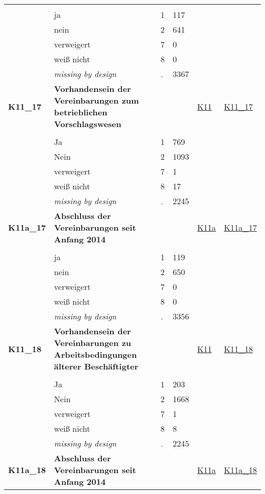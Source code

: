 \begin{longtable}{| L{2.45cm} | L{6cm} | C{1.5cm} | R{1cm} | C{2.25cm} | C{2.25cm} |}
   &  &  &  &  &  \\ 
   & ja & 1 & 117 &  &  \\ 
   & nein & 2 & 641 &  &  \\ 
   & verweigert & 7 & 0 &  &  \\ 
   & weiß nicht & 8 & 0 &  &  \\ 
   & \textit{missing by design} & \textit{.} & 3367 &  &  \\ 
   \midrule
\textbf{K11\_17}\label{var:K11:17} & \textbf{Vorhandensein der Vereinbarungen zum betrieblichen Vorschlagswesen} &  &  & \hyperref[K11]{K11} & \hyperref[var:suf:K11:17]{K11\_17} \\ 
   &  &  &  &  &  \\ 
   & Ja & 1 & 769 &  &  \\ 
   & Nein & 2 & 1093 &  &  \\ 
   & verweigert & 7 & 1 &  &  \\ 
   & weiß nicht & 8 & 17 &  &  \\ 
   & \textit{missing by design} & \textit{.} & 2245 &  &  \\ 
   \midrule
\textbf{K11a\_17}\label{var:K11a:17} & \textbf{Abschluss der Vereinbarungen seit Anfang 2014} &  &  & \hyperref[K11a]{K11a} & \hyperref[var:suf:K11a:17]{K11a\_17} \\ 
   &  &  &  &  &  \\ 
   & ja & 1 & 119 &  &  \\ 
   & nein & 2 & 650 &  &  \\ 
   & verweigert & 7 & 0 &  &  \\ 
   & weiß nicht & 8 & 0 &  &  \\ 
   & \textit{missing by design} & \textit{.} & 3356 &  &  \\ 
   \midrule
\textbf{K11\_18}\label{var:K11:18} & \textbf{Vorhandensein der Vereinbarungen zu Arbeitsbedingungen älterer Beschäftigter} &  &  & \hyperref[K11]{K11} & \hyperref[var:suf:K11:18]{K11\_18} \\ 
   &  &  &  &  &  \\ 
   & Ja & 1 & 203 &  &  \\ 
   & Nein & 2 & 1668 &  &  \\ 
   & verweigert & 7 & 1 &  &  \\ 
   & weiß nicht & 8 & 8 &  &  \\ 
   & \textit{missing by design} & \textit{.} & 2245 &  &  \\ 
   \midrule
\textbf{K11a\_18}\label{var:K11a:18} & \textbf{Abschluss der Vereinbarungen seit Anfang 2014} &  &  & \hyperref[K11a]{K11a} & \hyperref[var:suf:K11a:18]{K11a\_18} \\ 

\end{longtable}
